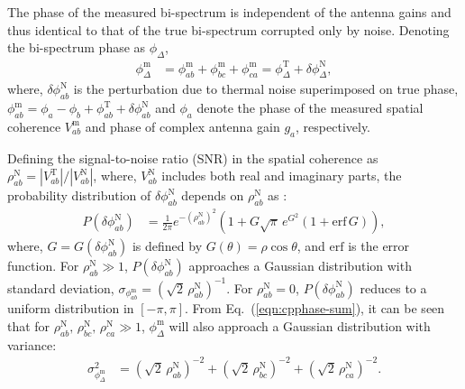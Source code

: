 \documentclass[
reprint,
superscriptaddress,
amsmath,
amssymb,
aps,
prd
]{revtex4-1}
\begin{document}
The phase of the measured bi-spectrum is independent of the antenna gains and thus identical to that of the true bi-spectrum corrupted only by noise. Denoting the bi-spectrum phase as $\phi_\Delta$, 
\begin{align}
  \phi_\Delta^\textrm{m} &= \phi_{ab}^\textrm{m} + \phi_{bc}^\textrm{m} + \phi_{ca}^\textrm{m} = \phi_\Delta^\textrm{T} + \delta\phi_\Delta^\textrm{N} \label{eqn:cpphase-sum},
\end{align}
where, $\delta\phi_{ab}^\textrm{N}$ is the perturbation due to thermal noise superimposed on true phase, $\phi_{ab}^\textrm{m} = \phi_a - \phi_b + \phi_{ab}^\textrm{T} + \delta\phi_{ab}^\textrm{N}$ and $\phi_a$ denote the phase of the measured spatial coherence $V_{ab}^\textrm{m}$ and phase of complex antenna gain $g_a$, respectively. 

Defining the signal-to-noise ratio (SNR) in the spatial coherence as $\rho_{ab}^\textrm{N} = |V_{ab}^\textrm{T}|/|V_{ab}^\textrm{N}|$, where, $V_{ab}^\textrm{N}$ includes both real and imaginary parts, the probability distribution of $\delta\phi_{ab}^\textrm{N}$ depends on $\rho_{ab}^\textrm{N}$ as \cite{cra89}:
\begin{align}
  P(\delta\phi_{ab}^\textrm{N}) &= \frac{1}{2\pi} e^{-(\rho_{ab}^\textrm{N})^2} \left(1 + G\sqrt{\pi}\,e^{G^2}(1+\mathrm{erf}\,G)\right),
\end{align}
where, $G=G(\delta\phi_{ab}^\textrm{N})$ is defined by $G(\theta)=\rho\cos\theta$, and $\mathrm{erf}$ is the error function. For $\rho_{ab}^\textrm{N}\gg 1$, $P(\delta\phi_{ab}^\textrm{N})$ approaches a Gaussian distribution with standard deviation, $\sigma_{\phi_{ab}^\textrm{m}} = (\sqrt{2}\,\rho_{ab}^\textrm{N})^{-1}$.
For $\rho_{ab}^\textrm{N}=0$, $P(\delta\phi_{ab}^\textrm{N})$ reduces to a uniform distribution in $[-\pi,\pi]$. From Eq.~(\ref{eqn:cpphase-sum}), it can be seen that for $\rho_{ab}^\textrm{N},\,\rho_{bc}^\textrm{N},\,\rho_{ca}^\textrm{N}\gg 1$, $\phi_\Delta^\textrm{m}$ will also approach a Gaussian distribution with variance:
\begin{align}
  \sigma_{\phi_\Delta^\textrm{m}}^2 &= (\sqrt{2}\,\rho_{ab}^\textrm{N})^{-2}+(\sqrt{2}\,\rho_{bc}^\textrm{N})^{-2}+(\sqrt{2}\,\rho_{ca}^\textrm{N})^{-2}. \label{eqn:cprms-noise}
\end{align}
\end{document}
